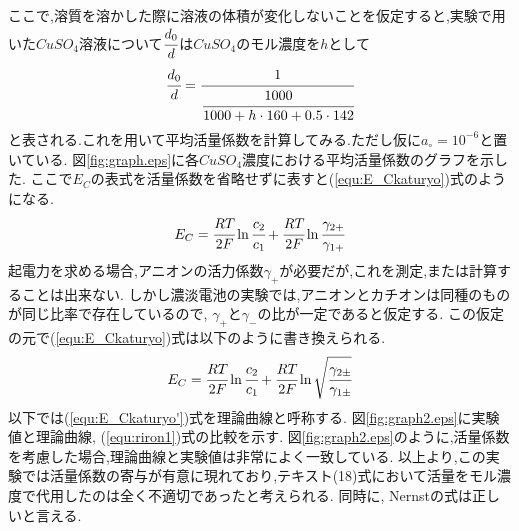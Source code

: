 ここで,溶質を溶かした際に溶液の体積が変化しないことを仮定すると,実験で用いた$CuSO_4$溶液について$\cfrac{d_0}{d}$は$CuSO_4$のモル濃度を$h$として
\begin{equation}
  \label{equ:h}
  \cfrac{d_0}{d}=\cfrac{1}{\cfrac{1000}{1000+h\cdot160+0.5\cdot142}}
\end{equation}
と表される.これを用いて平均活量係数を計算してみる.ただし仮に$a_{\circ}=10^{-6}$と置いている.
図\ref{fig:graph.eps}に各$CuSO_4$濃度における平均活量係数のグラフを示した.
ここで$E_C$の表式を活量係数を省略せずに表すと(\ref{equ:E_Ckaturyo})式のようになる.
\begin{equation}
  \label{equ:E_Ckaturyo}
  E_C=\cfrac{RT}{2F}\ln \cfrac{c_2}{c_1} + \cfrac{RT}{2F}\ln \cfrac{\gamma_{2+}}{\gamma_{1+}}
\end{equation}
起電力を求める場合,アニオンの活力係数$\gamma_+$が必要だが,これを測定,または計算することは出来ない.
しかし濃淡電池の実験では,アニオンとカチオンは同種のものが同じ比率で存在しているので, $\gamma_{+}$と$\gamma_{-}$の比が一定であると仮定する.
この仮定の元で(\ref{equ:E_Ckaturyo})式は以下のように書き換えられる.
\begin{equation}
  \label{equ:E_Ckaturyo'}
  E_C=\cfrac{RT}{2F}\ln \cfrac{c_2}{c_1} + \cfrac{RT}{2F}\ln \sqrt{\cfrac{\gamma_{2\pm}}{\gamma_{1\pm}}}
\end{equation}
以下では(\ref{equ:E_Ckaturyo'})式を理論曲線と呼称する.
図\ref{fig:graph2.eps}に実験値と理論曲線, (\ref{equ:riron1})式の比較を示す.
図\ref{fig:graph2.eps}のように,活量係数を考慮した場合,理論曲線と実験値は非常によく一致している.
以上より,この実験では活量係数の寄与が有意に現れており,テキスト(18)式において活量をモル濃度で代用したのは全く不適切であったと考えられる.
同時に, Nernstの式は正しいと言える.
